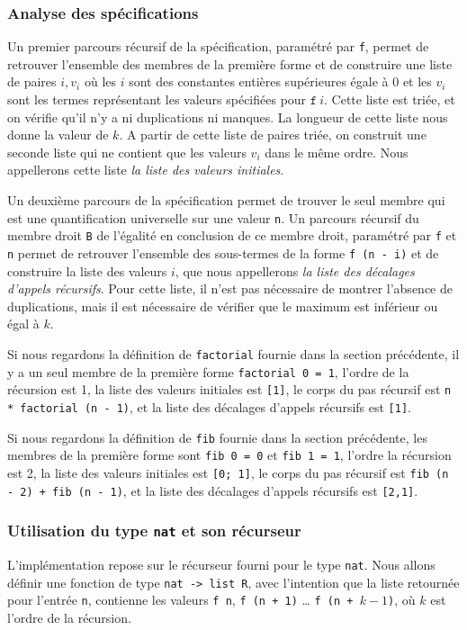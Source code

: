 \documentclass[draft]{jflart}
\begin{document}
\subsubsection{Analyse des spécifications}
Un premier parcours récursif de la spécification, paramétré par
\texttt{f}, permet de retrouver l'ensemble des membres de la première forme
et de construire une liste de paires \(i, v_i\) où les \(i\) sont des
constantes entières supérieures égale à 0 et les \(v_i\) sont les
termes représentant les valeurs spécifiées pour \(\texttt{f}~i\).  Cette
liste est triée, et on vérifie qu'il n'y a ni duplications ni manques.
La longueur de cette liste nous donne la valeur de \(k\).  A partir
de cette liste de paires triée, on construit une seconde liste qui ne
contient que les valeurs \(v_i\) dans le même ordre.  Nous appellerons
cette liste {\em la liste des valeurs initiales}.

Un deuxième parcours de la spécification permet de trouver le seul
membre qui est une quantification universelle sur une valeur \texttt{n}.
Un parcours récursif du membre droit \texttt{B} de l'égalité en conclusion de
ce membre droit, paramétré par \texttt{f} et \texttt{n}  permet de retrouver
l'ensemble des sous-termes de la forme \texttt{f (n - i)} et de
construire la liste des valeurs \(i\), que nous appellerons {\em la liste des
décalages d'appels récursifs}.  Pour cette liste, il n'est
pas nécessaire de montrer l'absence de duplications, mais il est
nécessaire de vérifier que le maximum est inférieur ou égal à \(k\).

Si nous regardons la définition de \texttt{factorial} fournie dans la
section précédente, il y a un seul membre de la première forme
\texttt{factorial 0 = 1}, l'ordre de la récursion est 1,
la liste des valeurs initiales est \texttt{[1]}, le
corps du pas récursif est \texttt{n * factorial (n - 1)}, et la liste
des décalages d'appels récursifs est \texttt{[1]}.

Si nous regardons la définition de \texttt{fib} fournie dans la section
précédente, les membres de la première forme sont \texttt{fib 0 = 0} et
\texttt{fib 1 = 1}, l'ordre la récursion est 2,
la liste des valeurs initiales est \texttt{[0; 1]},
le corps du pas récursif est \texttt{fib (n - 2) + fib (n - 1)}, et
la liste des décalages d'appels récursifs est \texttt{[2,1]}.

\subsubsection{Utilisation du type \texttt{nat} et son récurseur}
L'implémentation repose sur le récurseur fourni pour le type
\texttt{nat}.  Nous allons définir une fonction de type \texttt{nat -> list
  R}, avec l'intention que la liste retournée pour l'entrée \texttt{n},
contienne les valeurs \texttt{f n}, \texttt{f (n + 1)} \dots
\texttt{f (n + \(k - 1\))}, où \(k\) est l'ordre de la récursion.
\end{document}
